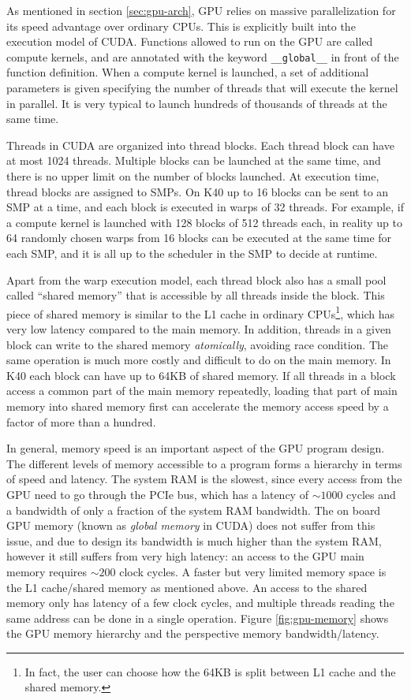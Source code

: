 As mentioned in section \ref{sec:gpu-arch}, GPU relies on massive
parallelization for its speed advantage over ordinary CPUs. This is explicitly
built into the execution model of CUDA. Functions allowed to run on the GPU are
called compute kernels, and are annotated with the keyword \verb!__global__! in
front of the function definition. When a compute kernel is launched, a set of
additional parameters is given specifying the number of threads that will
execute the kernel in parallel. It is very typical to launch hundreds of
thousands of threads at the same time.

Threads in CUDA are organized into thread blocks. Each thread block can have at
most 1024 threads. Multiple blocks can be launched at the same time, and there
is no upper limit on the number of blocks launched. At execution time, thread
blocks are assigned to SMPs. On K40 up to 16 blocks can be sent to an SMP at a
time, and each block is executed in warps of 32 threads. For example, if a
compute kernel is launched with 128 blocks of 512 threads each, in reality up to
64 randomly chosen warps from 16 blocks can be executed at the same time for
each SMP, and it is all up to the scheduler in the SMP to decide at runtime.

Apart from the warp execution model, each thread block also has a small pool
called ``shared memory'' that is accessible by all threads inside the block.
This piece of shared memory is similar to the L1 cache in ordinary
CPUs\footnote{In fact, the user can choose how the 64KB is split between L1
  cache and the shared memory.}, which has very low latency compared to the main
memory. In addition, threads in a given block can write to the shared memory
{\it atomically}, avoiding race condition. The same operation is much more
costly and difficult to do on the main memory. In K40 each block can have up to
64KB of shared memory. If all threads in a block access a common part of the
main memory repeatedly, loading that part of main memory into shared memory
first can accelerate the memory access speed by a factor of more than a hundred.

In general, memory speed is an important aspect of the GPU program design. The
different levels of memory accessible to a program forms a hierarchy in terms of
speed and latency. The system RAM is the slowest, since every access from the
GPU need to go through the PCIe bus, which has a latency of $\sim 1000$ cycles
and a bandwidth of only a fraction of the system RAM bandwidth. The on board GPU
memory (known as {\it global memory} in CUDA) does not suffer from this issue,
and due to design its bandwidth is much higher than the system RAM, however it
still suffers from very high latency: an access to the GPU main memory requires
$\sim 200$ clock cycles. A faster but very limited memory space is the L1
cache/shared memory as mentioned above. An access to the shared memory only has
latency of a few clock cycles, and multiple threads reading the same address can
be done in a single operation. Figure \ref{fig:gpu-memory}%
shows the GPU memory hierarchy and the perspective memory bandwidth/latency.

